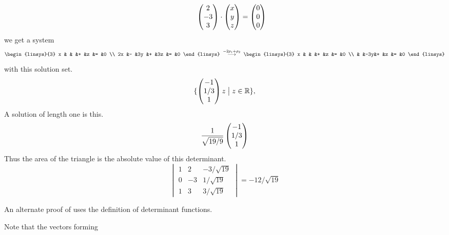 \begin{exercises}
\begin{answer}
\begin{equation*}
        \qquad
        \begin{pmatrix} 2 \\ -3 \\ 3 \end{pmatrix}
        \cdot\begin{pmatrix} x \\ y \\ z \end{pmatrix}
        =\begin{pmatrix} 0 \\ 0 \\ 0 \end{pmatrix}
      \end{equation*}
      we get a system
      \begin{equation*}
        \begin{linsys}{3}
          x  &   &   &+  &z  &=  &0  \\
         2x  &-  &3y &+  &3z &=  &0  
        \end{linsys}
        \;\grstep{-2\rho_1+\rho_2}\;
        \begin{linsys}{3}
          x  &   &   &+  &z  &=  &0  \\
             &   &-3y&+  &z  &=  &0  
        \end{linsys}
      \end{equation*}
      with this solution set.
      \begin{equation*}
        \mbox{$\{\begin{pmatrix} -1 \\ 1/3 \\ 1 \end{pmatrix}z\bigm| z\in\mathbb{R}\}$},
      \end{equation*}
      A solution of length one is this.
      \begin{equation*}
        \frac{1}{\sqrt{19/9}}\begin{pmatrix} -1 \\ 1/3 \\ 1 \end{pmatrix}
      \end{equation*}
      Thus the area of the triangle is the absolute value of
      this determinant.
      \begin{equation*}
        \begin{vmatrix}
             1  &2   &-3/\sqrt{19}   \\
             0  &-3  &1/\sqrt{19}   \\
             1  &3   &3/\sqrt{19}
        \end{vmatrix}
        =-12/\sqrt{19}
      \end{equation*} 
    \end{answer}
  \recommended \item \label{exer:DetProdEqProdDetsFcn}
    An alternate proof of  uses 
    the definition of determinant functions.
    \begin{exparts}
      \partsitem Note that the vectors forming

\end{exparts}
\end{exercises}
